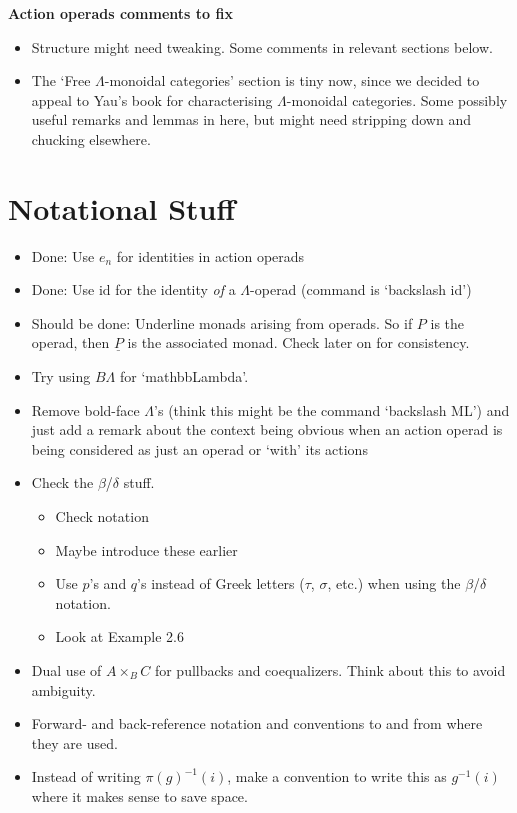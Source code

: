 \documentclass{amsart}
\begin{document}
\begin{center}
\begin{Large}
\textbf{Action operads comments to fix}
\end{Large}
\end{center}
\vskip1cm

\begin{itemize}
	\item Structure might need tweaking. Some comments in relevant sections below.
	\item The `Free $\Lambda$-monoidal categories' section is tiny now, since we decided to appeal to Yau's book for characterising $\Lambda$-monoidal categories. Some possibly useful remarks and lemmas in here, but might need stripping down and chucking elsewhere.
\end{itemize}

\section*{Notational Stuff}
\begin{itemize}
	\item Done: Use $e_n$ for identities in action operads
	\item Done: Use $\mbox{id}$ for the identity \emph{of} a $\Lambda$-operad (command is `backslash id')
	\item Should be done: Underline monads arising from operads. So if $P$ is the operad, then $\underline{P}$ is the associated monad. Check later on for consistency.
	\item Try using $B\Lambda$ for `mathbb{Lambda}'.
	\item Remove bold-face $\Lambda$'s (think this might be the command `backslash ML') and just add a remark about the context being obvious when an action operad is being considered as just an operad or `with' its actions
	\item Check the $\beta$/$\delta$ stuff.
		\begin{itemize}
			\item Check notation
			\item Maybe introduce these earlier
			\item Use $p$'s and $q$'s instead of Greek letters ($\tau$, $\sigma$, etc.) when using the $\beta$/$\delta$ notation.
			\item Look at Example 2.6
		\end{itemize}
	\item Dual use of $A \times_B C$ for pullbacks and coequalizers. Think about this to avoid ambiguity.
	\item Forward- and back-reference notation and conventions to and from where they are used.
	\item Instead of writing $\pi(g)^{-1}(i)$, make a convention to write this as $g^{-1}(i)$ where it makes sense to save space.
\end{itemize}
\end{document}
